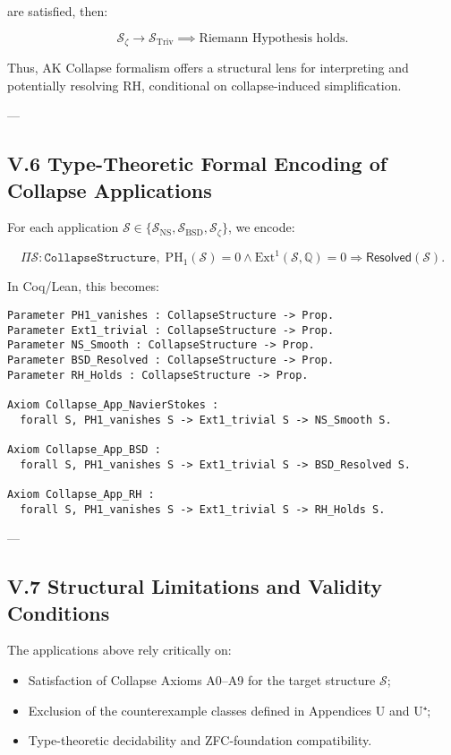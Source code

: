 \documentclass[11pt]{article}
\begin{document}
are satisfied, then:

\[
\mathcal{S}_{\zeta} \longrightarrow \mathcal{S}_{\mathrm{Triv}} \implies \text{Riemann Hypothesis holds}.
\]

Thus, AK Collapse formalism offers a structural lens for interpreting and potentially resolving RH, conditional on collapse-induced simplification.


---

\subsection*{V.6 Type-Theoretic Formal Encoding of Collapse Applications}

For each application $\mathcal{S} \in \{\mathcal{S}_{\mathrm{NS}}, \mathcal{S}_{\mathrm{BSD}}, \mathcal{S}_{\zeta}\}$, we encode:

\[
\Pi \mathcal{S} : \texttt{CollapseStructure},\;
\mathrm{PH}_1(\mathcal{S}) = 0 \wedge \mathrm{Ext}^1(\mathcal{S}, \mathbb{Q}) = 0
\Rightarrow
\mathsf{Resolved}(\mathcal{S}).
\]

In Coq/Lean, this becomes:

\begin{lstlisting}[language=Coq]
Parameter PH1_vanishes : CollapseStructure -> Prop.
Parameter Ext1_trivial : CollapseStructure -> Prop.
Parameter NS_Smooth : CollapseStructure -> Prop.
Parameter BSD_Resolved : CollapseStructure -> Prop.
Parameter RH_Holds : CollapseStructure -> Prop.

Axiom Collapse_App_NavierStokes :
  forall S, PH1_vanishes S -> Ext1_trivial S -> NS_Smooth S.

Axiom Collapse_App_BSD :
  forall S, PH1_vanishes S -> Ext1_trivial S -> BSD_Resolved S.

Axiom Collapse_App_RH :
  forall S, PH1_vanishes S -> Ext1_trivial S -> RH_Holds S.
\end{lstlisting}

---

\subsection*{V.7 Structural Limitations and Validity Conditions}

The applications above rely critically on:

\begin{itemize}
    \item Satisfaction of Collapse Axioms A0–A9 for the target structure $\mathcal{S}$;
    \item Exclusion of the counterexample classes defined in Appendices U and U⁺;
    \item Type-theoretic decidability and ZFC-foundation compatibility.
\end{itemize}
\end{document}
